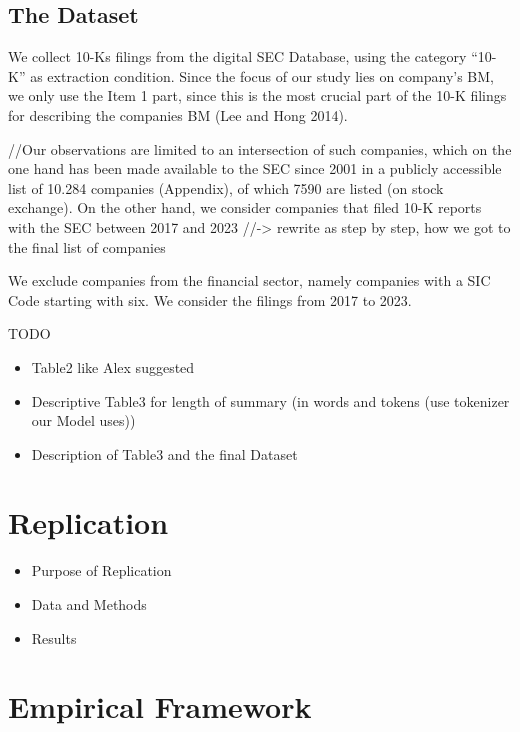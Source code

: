 \documentclass[
]{article}
\providecommand{\tightlist}{%
  \setlength{\itemsep}{0pt}\setlength{\parskip}{0pt}}\usepackage{longtable,booktabs,array}
\begin{document}
\subsection{The Dataset}\label{the-dataset}

We collect 10-Ks filings from the digital SEC Database, using the
category ``10-K'' as extraction condition. Since the focus of our study
lies on company's BM, we only use the Item 1 part, since this is the
most crucial part of the 10-K filings for describing the companies BM
(Lee and Hong 2014).

//Our observations are limited to an intersection of such companies,
which on the one hand has been made available to the SEC since 2001 in a
publicly accessible list of 10.284 companies (Appendix), of which 7590
are listed (on stock exchange). On the other hand, we consider companies
that filed 10-K reports with the SEC between 2017 and 2023
//-\textgreater{} rewrite as step by step, how we got to the final list
of companies

We exclude companies from the financial sector, namely companies with a
SIC Code starting with six. We consider the filings from 2017 to 2023.

TODO

\begin{itemize}
\tightlist
\item
  Table2 like Alex suggested
\item
  Descriptive Table3 for length of summary (in words and tokens (use
  tokenizer our Model uses))
\item
  Description of Table3 and the final Dataset
\end{itemize}

\section{Replication}\label{replication}

\begin{itemize}
\item
  Purpose of Replication
\item
  Data and Methods
\item
  Results
\end{itemize}

\section{Empirical Framework}\label{empirical-framework}
\end{document}
